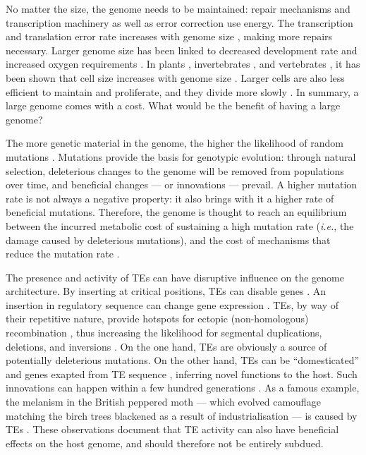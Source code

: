 No matter the size, the genome needs to be maintained: repair mechanisms
and transcription machinery as well as error correction use energy. The
transcription and translation error rate increases with genome size
\citep{Zaher2009}, making more repairs necessary. Larger genome size has
been linked to decreased development rate \citep{White2000} and
increased oxygen requirements \citep{Vinogradov1997, Gregory2002}. In
plants \citep{Grime1983}, invertebrates \citep{Gregory2005}, and
vertebrates \citep{Horner1983, Olmo1982, Gregory2000}, it has been shown
that cell size increases with genome size \citep{Dufresne2011}. Larger
cells are also less efficient to maintain and proliferate, and they
divide more slowly \citep{Bennett1977}. In summary, a large genome comes
with a cost. What would be the benefit of having a large genome?

The more genetic material in the genome, the higher the likelihood of
random mutations \citep{Wielgoss2011}. Mutations provide the basis for
genotypic evolution: through natural selection, deleterious changes to
the genome will be removed from populations over time, and beneficial
changes --- or innovations --- prevail. A higher mutation rate is not
always a negative property: it also brings with it a higher rate of
beneficial mutations. Therefore, the genome is thought to reach an
equilibrium between the incurred metabolic cost of sustaining a high
mutation rate (\emph{i.e.}, the damage caused by deleterious mutations),
and the cost of mechanisms that reduce the mutation rate
\citep{Bernstein1987, Altenberg2011}.

The presence and activity of TEs can have disruptive influence on the
genome architecture. By inserting at critical positions, TEs can disable
genes \citep{Kazazian1988}. An insertion in regulatory sequence can
change gene expression \citep{Warnefors2010}. TEs, by way of their
repetitive nature, provide hotspots for ectopic (non-homologous)
recombination \citep{Lim1988, Gray2000, Fiston-Lavier2007}, thus
increasing the likelihood for segmental duplications, deletions, and
inversions \citep{Mathiopoulos1998, Remnant2013}. On the one hand, TEs
are obviously a source of potentially deleterious mutations. On the
other hand, TEs can be ``domesticated'' and genes exapted from TE
sequence \citep{Gahan2001, Daborn2002, Aminetzach2005, Chen2007},
inferring novel functions to the host. Such innovations can happen
within a few hundred generations \citep{Dolgin2006, Struchiner2009,
Kofler2015}. As a famous example, the melanism in the British peppered
moth --- which evolved camouflage matching the birch trees blackened as
a result of industrialisation --- is caused by TEs \citep{Hof2016}.
These observations document that TE activity can also have beneficial
effects on the host genome, and should therefore not be entirely
subdued.

